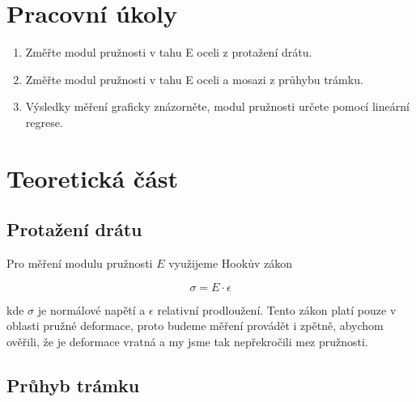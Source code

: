 \section{Pracovní úkoly}

\begin{enumerate}
\item Změřte modul pružnosti v tahu E oceli z protažení drátu.

\item Změřte modul pružnosti v tahu E oceli a mosazi z průhybu trámku.

\item Výsledky měření graficky znázorněte, modul pružnosti určete pomocí lineární regrese.

\end{enumerate}

\section{Teoretická část}

\subsection{Protažení drátu}

Pro měření modulu pružnosti \(E\) využijeme Hookův zákon

\begin{equation}
    \sigma = E \cdot \epsilon
\end{equation}

kde \(\sigma\) je normálové napětí a \(\epsilon\) relativní prodloužení. Tento zákon platí pouze v oblasti pružné deformace, proto budeme měření provádět i zpětně, abychom ověřili, že je deformace vratná a my jsme tak nepřekročili mez pružnosti.

\subsection{Průhyb trámku}

